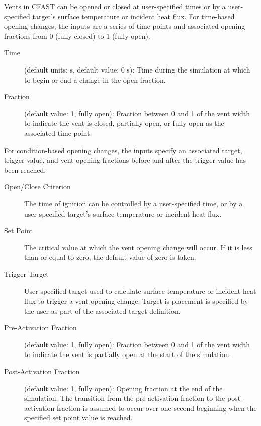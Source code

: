 Vents in CFAST can be opened or closed at user-specified times or by a user-specified target's surface temperature or incident heat flux. For time-based opening changes, the inputs are a series of time points and associated opening fractions from 0 (fully closed) to 1 (fully open).

\begin{description}
\item[Time] (default units: s, default value: 0 s): Time during the simulation at which to begin or end a change in the open fraction.
\item[Fraction] (default value: 1, fully open): Fraction between 0 and 1 of the vent width to indicate the vent is closed, partially-open, or fully-open as the associated time point.
\end{description}

For condition-based opening changes, the inputs specify an associated target, trigger value, and vent opening fractions before and after the trigger value has been reached.

\begin{description}
\item[Open/Close Criterion] The time of ignition can be controlled by a user-specified time, or by a user-specified target's surface temperature or incident heat flux.
\item[Set Point] The critical value at which the vent opening change will occur. If it is less than or equal to zero, the default value of zero is taken.
\item[Trigger Target] User-specified target used to calculate surface temperature or incident heat flux to trigger a vent opening change. Target is placement is specified by the user as part of the associated target definition.
\item[Pre-Activation Fraction] (default value: 1, fully open): Fraction between 0 and 1 of the vent width to indicate the vent is partially open at the start of the simulation.
\item[Post-Activation Fraction] (default value: 1, fully open): Opening fraction at the end of the simulation. The transition from the pre-activation fraction to the post-activation fraction is assumed to occur over one second beginning when the specified set point value is reached.
\end{description}

